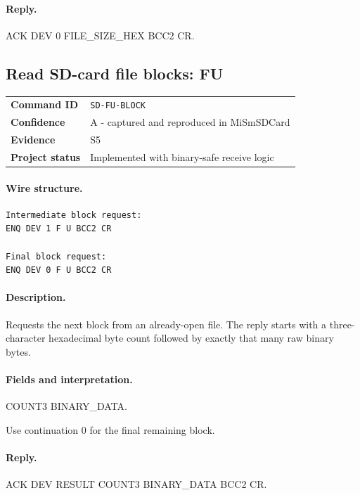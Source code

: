 \documentclass[10pt,letterpaper]{article}
\begin{document}
\paragraph{Reply.} ACK DEV 0 FILE\_SIZE\_HEX BCC2 CR.

\subsection{Read SD-card file blocks: FU}
\begin{tabularx}{\textwidth}{@{}>{\bfseries}p{2.8cm}X@{}}
Command ID & \texttt{SD-FU-BLOCK} \\
Confidence & A - captured and reproduced in MiSmSDCard \\
Evidence & S5 \\
Project status & Implemented with binary-safe receive logic \\
\end{tabularx}
\vspace{0.35em}
\paragraph{Wire structure.}
\begin{Verbatim}[breaklines=true,breakanywhere=true,fontsize=\small]
Intermediate block request:
ENQ DEV 1 F U BCC2 CR

Final block request:
ENQ DEV 0 F U BCC2 CR
\end{Verbatim}
\paragraph{Description.} Requests the next block from an already-open file. The reply starts with a three-character hexadecimal byte count followed by exactly that many raw binary bytes.
\paragraph{Fields and interpretation.}
\begin{description}[style=nextline,leftmargin=3.2cm,labelwidth=3.0cm,font=\normalfont\bfseries]
\item[Reply data] COUNT3 BINARY\_DATA.
\item[Termination] Use continuation 0 for the final remaining block.
\end{description}
\paragraph{Reply.} ACK DEV RESULT COUNT3 BINARY\_DATA BCC2 CR.
\end{document}
